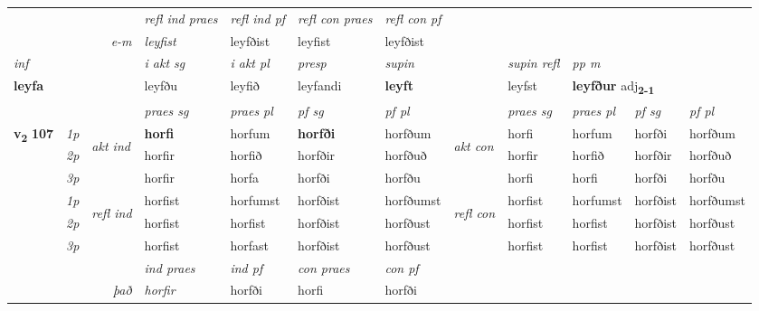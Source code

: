 \begin{longtable}[l]{X>{\footnotesize\itshape}llXXXXlXXXX}
 & && \textit{refl ind praes} & \textit{refl ind pf} & \textit{refl con praes} & \textit{refl con pf} \\*
\multicolumn{3}{r}{\textit{e-m}}& leyfist & leyfðist & leyfist & leyfðist \\*

\cmidrule{4-7}
   {\textit{inf}} & &  & \textit{i akt sg} & \textit{i akt pl}   & \textit{presp} & \textit{supin} && \textit{supin refl} & \textit{pp m} \\*
  {\textbf{leyfa}} & && leyfðu  & leyfið   & leyfandi &  \textbf{leyft} && leyfst & \multicolumn{2}{l}{\textbf{leyfður} adj\textbf{\textsubscript{2-1}}} \\*

\midrule

 & &   & \textit{praes sg}  & \textit{praes pl}    & \textit{ pf sg} & \textit{pf pl} & & \textit{praes sg}  & \textit{praes pl}    & \textit{pf sg} & \textit{pf pl }  \\ \cmidrule{4-7} \cmidrule{9-12}
 \multirow{2}{*}{{{\textbf{v{\textsubscript{2}}} \Large{\textbf{107}}}}}  & 1p & \multirow{3}{*}{\begin{turn}{90}\textit{akt ind}\end{turn}} & \textbf{horfi} & horfum & \textbf{horfði} & horfðum & \multirow{3}{*}{\begin{turn}{90}\textit{akt con}\end{turn}} &horfi & horfum & horfði & horfðum\\*
 & 2p &  &  horfir  & horfið & horfðir & horfðuð & & horfir & horfið & horfðir & horfðuð \\*
 & 3p &  & horfir & horfa & horfði & horfðu & & horfi & horfi& horfði & horfðu \\*
\cmidrule{4-7} \cmidrule{9-12}
 & 1p & \multirow{3}{*}{\begin{turn}{90}\textit{refl ind}\end{turn}}  & horfist & horfumst & horfðist & horfðumst & \multirow{3}{*}{\begin{turn}{90}\textit{refl con}\end{turn}}  &horfist & horfumst & horfðist & horfðumst \\*
 & 2p &  & horfist & horfist & horfðist & horfðust & &horfist & horfist & horfðist & horfðust \\*
 & 3p  & & horfist & horfast & horfðist & horfðust & & horfist & horfist& horfðist & horfðust \\*
\cmidrule{4-7} \cmidrule{9-12}

   && &  \textit{ind praes} & \textit{ind pf} & \textit{con praes} & \textit{con pf} \\*
\multicolumn{3}{r}{\textit{það}} & horfir & horfði & horfi & horfði \\*


\end{longtable}

